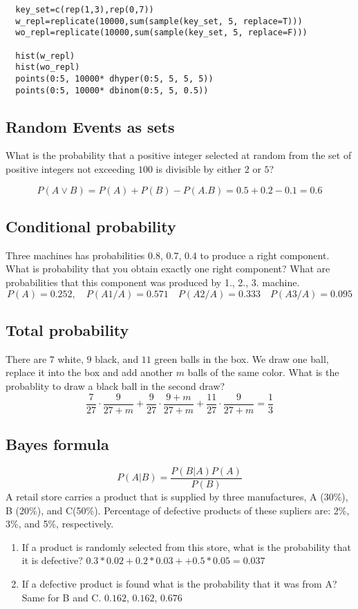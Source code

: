 \documentclass[4pt]{article}
\def\result#1{{\color{green} #1}}
\def\answer#1{{\color{red} #1}}
\begin{document}
\begin{verbatim}  
  key_set=c(rep(1,3),rep(0,7))
  w_repl=replicate(10000,sum(sample(key_set, 5, replace=T)))
  wo_repl=replicate(10000,sum(sample(key_set, 5, replace=F)))
  
  hist(w_repl)
  hist(wo_repl)
  points(0:5, 10000* dhyper(0:5, 5, 5, 5))
  points(0:5, 10000* dbinom(0:5, 5, 0.5))
\end{verbatim}

\subsection{Random Events as sets}
What is the probability that a positive integer selected at random from
the set of positive integers not exceeding $100$ is divisible by either $2$ or $5$?

\answer{
\[
 P(A \vee B) = P(A) + P(B) - P(A.B) = 0.5 + 0.2 - 0.1 = 0.6 
\]
}



\subsection{Conditional probability}
Three machines has probabilities $0.8$, $0.7$, $0.4$ to produce a right component. 
What is probability that you obtain exactly one right component? What are probabilities
that this component was produced by 1., 2., 3. machine. 
\result{
\[
        P(A) = 0.252,\quad 
        P(A1/A) = 0.571\quad
        P(A2/A) = 0.333\quad
        P(A3/A) = 0.095
\]        
}


\subsection{Total probability}
There are $7$ white, $9$ black, and $11$ green balls in the box. We draw one ball, replace it into the box and add another $m$ balls of the same color. 
What is the probablity to draw a black ball in the second draw?
\answer{
\[
    \frac{7}{27}\cdot\frac{9}{27+m}+\frac{9}{27}\cdot\frac{9+m}{27+m}+\frac{11}{27}\cdot\frac{9}{27+m} = \frac{1}{3}
\]    
}

\subsection{Bayes formula}
\[
   P(A|B) = \frac{P(B | A) P(A)}{P(B)} 
\]
A retail store carries a product that is supplied by three manufactures, A (30\%), B (20\%), and C(50\%). 
Percentage of defective products of these supliers are: 2\%, 3\%, and 5\%, respectively.
\begin{enumerate}
 \item If a product is randomly selected from this store, what is the probability that it is
defective? \answer{ $0.3*0.02 +0.2*0.03 + +0.5*0.05 = 0.037$ }
 \item If a defective product is found what is the probability that it was from A? Same for B and C.
 \answer{ $0.162$, $0.162$, $0.676$}
\end{enumerate}
\end{document}

